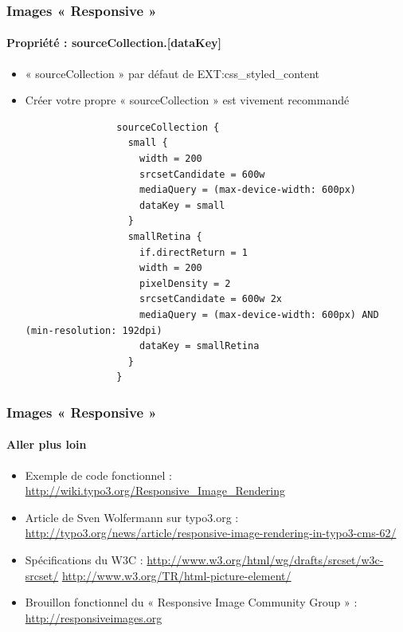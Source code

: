 
\begin{frame}[fragile]
	\frametitle{Images « Responsive »}
	\framesubtitle{Propriété : sourceCollection.[dataKey]}

	\begin{itemize}
		\item « sourceCollection » par défaut de EXT:css\_styled\_content
		\item Créer votre propre « sourceCollection » est vivement recommandé

			\lstset{
				basicstyle=\tiny\ttfamily
			}

			\begin{lstlisting}
				sourceCollection {
				  small {
				    width = 200
				    srcsetCandidate = 600w
				    mediaQuery = (max-device-width: 600px)
				    dataKey = small
				  }
				  smallRetina {
				    if.directReturn = 1
				    width = 200
				    pixelDensity = 2
				    srcsetCandidate = 600w 2x
				    mediaQuery = (max-device-width: 600px) AND (min-resolution: 192dpi)
				    dataKey = smallRetina
				  }
				}
			\end{lstlisting}
	\end{itemize}

\end{frame}


\begin{frame}[fragile]
	\frametitle{Images « Responsive »}
	\framesubtitle{Aller plus loin}

	\begin{itemize}
		\item Exemple de code fonctionnel :\newline
			\small\url{http://wiki.typo3.org/Responsive_Image_Rendering}\normalsize

		\item Article de Sven Wolfermann sur typo3.org :\newline
			\small\url{http://typo3.org/news/article/responsive-image-rendering-in-typo3-cms-62/}\normalsize

		\item Spécifications du W3C :\newline
			\small\url{http://www.w3.org/html/wg/drafts/srcset/w3c-srcset/}\newline
			\small\url{http://www.w3.org/TR/html-picture-element/}\normalsize

		\item Brouillon fonctionnel du « Responsive Image Community Group » :\newline
			\small\url{http://responsiveimages.org}\normalsize

	\end{itemize}

\end{frame}


